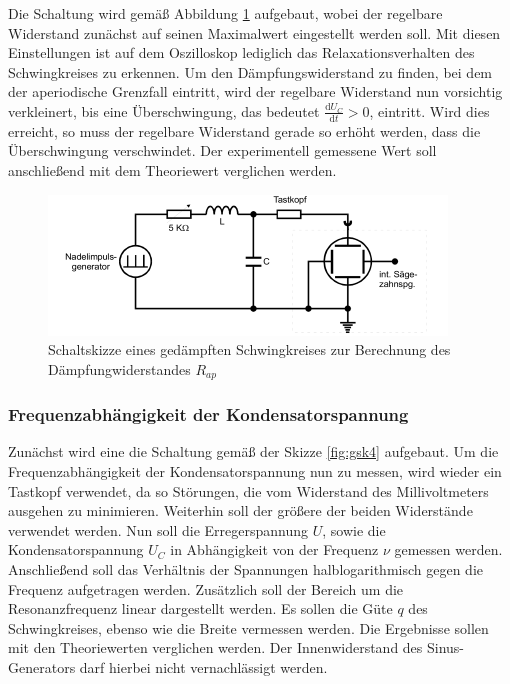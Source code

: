 Die Schaltung wird gemäß Abbildung \ref{fig:gsk3} aufgebaut, wobei der regelbare Widerstand zunächst
auf seinen Maximalwert eingestellt werden soll. Mit diesen Einstellungen ist auf dem Oszilloskop
lediglich das Relaxationsverhalten des Schwingkreises zu erkennen. Um den Dämpfungswiderstand 
zu finden, bei dem der aperiodische Grenzfall eintritt, wird der regelbare Widerstand nun vorsichtig
verkleinert, bis eine Überschwingung, das bedeutet $\frac{\mathrm{d}U_C}{\mathrm{d}t} > 0$, eintritt.
Wird dies erreicht, so muss der regelbare Widerstand gerade so erhöht werden, dass die Überschwingung
verschwindet. Der experimentell gemessene Wert soll anschließend mit dem Theoriewert verglichen werden.

\begin{figure}[H]
  \centering
  \includegraphics{content/aufgabeB.png}
  \caption{Schaltskizze eines gedämpften Schwingkreises zur Berechnung des Dämpfungwiderstandes $R_{ap}$}
  \label{fig:gsk3}
\end{figure}


\subsubsection{Frequenzabhängigkeit der Kondensatorspannung}

Zunächst wird eine die Schaltung gemäß der Skizze \ref{fig:gsk4} aufgebaut. Um die Frequenzabhängigkeit 
der Kondensatorspannung nun zu messen, wird wieder ein Tastkopf verwendet, da so Störungen, die vom Widerstand
des Millivoltmeters ausgehen zu minimieren. Weiterhin soll der größere der beiden Widerstände verwendet werden.
Nun soll die Erregerspannung $U$, sowie die Kondensatorspannung $U_C$ in Abhängigkeit von der Frequenz $\nu$
gemessen werden. Anschließend soll das Verhältnis der Spannungen halblogarithmisch gegen die Frequenz aufgetragen werden.
Zusätzlich soll der Bereich um die Resonanzfrequenz linear dargestellt werden. Es sollen die Güte $q$ des
Schwingkreises, ebenso wie die Breite vermessen werden. Die Ergebnisse sollen mit den Theoriewerten 
verglichen werden. Der Innenwiderstand des Sinus-Generators darf hierbei nicht vernachlässigt werden.


